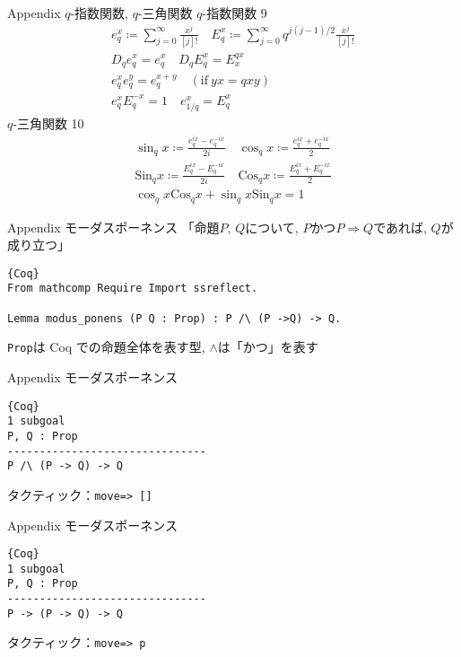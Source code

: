 \documentclass[dvipdfmx,cjk]{beamer}
\theoremstyle{mystyle}
\newcommand{\Lra}{\Longrightarrow}
\newcommand{\0}{\textbf{0}}
\begin{document}
\begin{frame}{Appendix $q$-指数関数, $q$-三角関数}
	$q$-指数関数\cite{Kac} 9
	\begin{align*}
		e^x_q \coloneqq \sum_{j = 0}^{\infty} \frac{x^j}{[j]!} \quad
		E^x_q \coloneqq \sum_{j = 0}^{\infty} q^{j(j - 1) / 2} \frac{x^j}{[j]!} \\
		D_q e^x_q = e^x_q \quad D_q E^x_q = E^{qx}_x \\
		e^x_q e^y_q = e^{x + y}_q \quad (\text{if}\ yx = qxy) \\
		e^x_q E^{-x}_q = 1 \quad e^x_{1/q} = E^x_q
	\end{align*}
	$q$-三角関数\cite{Kac} 10
	\begin{align*}
		\sin_q x \coloneqq \frac{e^{ix}_q - e^{-ix}_q}{2i} \quad
		\cos_q x \coloneqq \frac{e^{ix}_q + e^{-ix}_q}{2} \\
		\textrm{Sin}_q x \coloneqq \frac{E^{ix}_q - E^{-ix}_q}{2i} \quad
		\textrm{Cos}_q x \coloneqq \frac{E^{ix}_q + E^{-ix}_q}{2} \\
		\cos_q x \textrm{Cos}_q x + \sin_q x \textrm{Sin}_q x = 1
	\end{align*}
\end{frame}

\begin{frame}[fragile]{Appendix モーダスポーネンス}
	「命題$P$, $Q$について, $P$かつ$P \Lra Q$であれば, $Q$が成り立つ」 \pause
	\begin{lstlisting}{Coq}
From mathcomp Require Import ssreflect.

Lemma modus_ponens (P Q : Prop) : P /\ (P ->Q) -> Q. \end{lstlisting} \pause
	{\tt Prop}は Coq での命題全体を表す型, $\wedge$は「かつ」を表す
\end{frame}

\begin{frame}[fragile]{Appendix モーダスポーネンス}
	\begin{screen}
	  \begin{lstlisting}{Coq}
1 subgoal
P, Q : Prop
-------------------------------
P /\ (P -> Q) -> Q \end{lstlisting}
	\end{screen} \pause
	タクティック：{\tt move=> []}
\end{frame}

\begin{frame}[fragile]{Appendix モーダスポーネンス}
	\begin{screen}
	  \begin{lstlisting}{Coq}
1 subgoal
P, Q : Prop
-------------------------------
P -> (P -> Q) -> Q \end{lstlisting}
	\end{screen} \pause
	タクティック：{\tt move=> p}
\end{frame}
\end{document}
